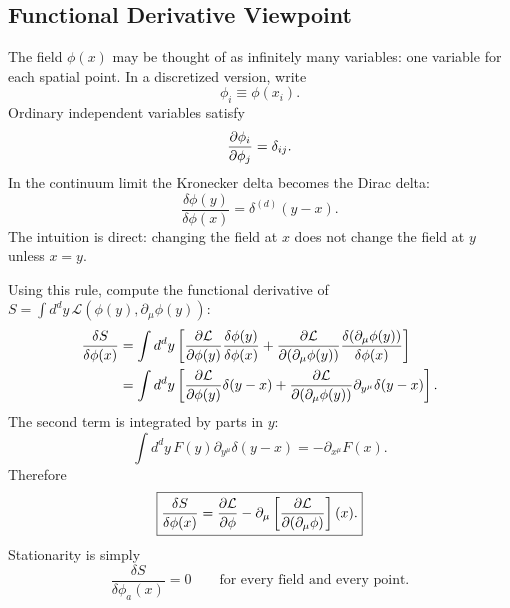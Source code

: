 \documentclass[../main.tex]{subfiles}
\begin{document}
\subsection{Functional Derivative Viewpoint}
The field $\phi(x)$ may be thought of as infinitely many variables: one variable
for each spatial point.  In a discretized version, write
\begin{equation}
  \phi_i\equiv \phi(x_i).
\end{equation}
Ordinary independent variables satisfy
\begin{equation}
  \pdv{\phi_i}{\phi_j}=\delta_{ij}.
\end{equation}
In the continuum limit the Kronecker delta becomes the Dirac delta:
\begin{equation}
  \boxed{\frac{\delta\phi(y)}{\delta\phi(x)}=\delta^{(d)}(y-x).}
  \label{eq:lec23_functional_delta}
\end{equation}
The intuition is direct: changing the field at $x$ does not change the field at
$y$ unless $x=y$.

Using this rule, compute the functional derivative of
$S=\int d^dy\,\mathcal L(\phi(y),\partial_\mu\phi(y))$:
\begin{align}
  \frac{\delta S}{\delta\phi(x)}
  &=\int d^dy\left[
    \pdv{\mathcal L}{\phi(y)}\frac{\delta\phi(y)}{\delta\phi(x)}
    +\pdv{\mathcal L}{(\partial_\mu\phi(y))}
      \frac{\delta(\partial_\mu\phi(y))}{\delta\phi(x)}
  \right] \\
  &=\int d^dy\left[
    \pdv{\mathcal L}{\phi(y)}\delta(y-x)
    +\pdv{\mathcal L}{(\partial_\mu\phi(y))}\partial_{y^\mu}\delta(y-x)
  \right].
\end{align}
The second term is integrated by parts in $y$:
\begin{equation}
  \int d^dy\,F(y)\partial_{y^\mu}\delta(y-x)
  =-\partial_{x^\mu}F(x).
\end{equation}
Therefore
\begin{equation}
  \boxed{
  \frac{\delta S}{\delta\phi(x)}
  =\pdv{\mathcal L}{\phi}(x)
  -\partial_\mu\left[\pdv{\mathcal L}{(\partial_\mu\phi)}\right](x).}
  \label{eq:lec23_functional_derivative_el}
\end{equation}
Stationarity is simply
\begin{equation}
  \frac{\delta S}{\delta\phi_a(x)}=0
  \qquad\text{for every field and every point.}
\end{equation}
\end{document}
